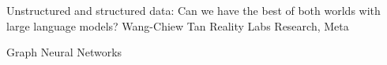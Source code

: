 \documentclass[11pt]{article}
\begin{document}
\begin{bulletin}
\begin{opinionsection}

\begin{opinion}{Unstructured and structured data: Can we have the best of both worlds with large language models?}
  {Wang-Chiew Tan}
  {Reality Labs Research, Meta}

\end{opinion}

\end{opinionsection}
\begin{articlesection}{Graph Neural Networks}
%
%


% 


\end{articlesection}
\end{bulletin}
\end{document}
